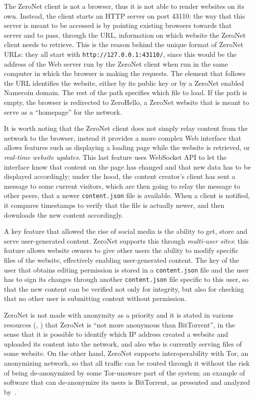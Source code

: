 \documentclass[mscthesis]{usiinfthesis}
\begin{document}
The ZeroNet client is not a browser, thus it is not able to render websites on its own. Instead, the client starts an HTTP server on port 43110: the way that this server is meant to be accessed is by pointing existing browsers towards that server and to pass, through the URL, information on which website the ZeroNet client needs to retrieve. This is the reason behind the unique format of ZeroNet URLs: they all start with \texttt{http://127.0.0.1:43110/}, since this would be the address of the Web server run by the ZeroNet client when run in the same computer in which the browser is making the requests. The element that follows the URL identifies the website, either by its public key or by a ZeroNet enabled Namecoin domain. The rest of the path specifies which file to load. If the path is empty, the browser is redirected to ZeroHello, a ZeroNet website that is meant to serve as a ``homepage'' for the network.

It is worth noting that the ZeroNet client does not simply relay content from the network to the browser, instead it provides a more complex Web interface that allows features such as displaying a loading page while the website is retrieved, or \emph{real-time website updates}. This last feature uses WebSocket API to let the interface know that content on the page has changed and that new data has to be displayed accordingly; under the hood, the content creator's client has sent a message to some current visitors, which are then going to relay the message to other peers, that a newer \texttt{content.json} file is available. When a client is notified, it compares timestamps to verify that the file is actually newer, and then downloads the new content accordingly.

A key feature that allowed the rise of social media is the ability to get, store and serve user-generated content. ZeroNet supports this through \emph{multi-user sites}: this feature allows website owners to give other users the ability to modify specific files of the website, effectively enabling user-generated content. The key of the user that obtains editing permission is stored in a \texttt{content.json} file and the user has to sign its changes through another \texttt{content.json} file specific to this user, so that the new content can be verified not only for integrity, but also for checking that no other user is submitting content without permission.

ZeroNet is not made with anonymity as a priority and it is stated in various resources (\cite{website:zeronetpresentation}, \cite{website:zeronetfaq}) that ZeroNet is ``not more anonymous than BitTorrent'', in the sense that it is possible to identify which IP address created a website and uploaded its content into the network, and also who is currently serving files of some website. On the other hand, ZeroNet supports interoperability with Tor, an anonymizing network, so that all traffic can be routed through it without the risk of being de-anonymized by some Tor-unaware part of the system; an example of software that can de-anonymize its users is BitTorrent, as presented and analyzed by~\cite{manils2010compromising}.
\end{document}
